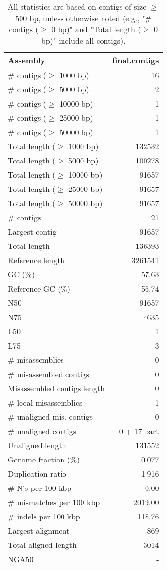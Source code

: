 \documentclass[12pt,a4paper]{article}
\begin{document}
\begin{table}[ht]
\begin{center}
\caption{All statistics are based on contigs of size $\geq$ 500 bp, unless otherwise noted (e.g., "\# contigs ($\geq$ 0 bp)" and "Total length ($\geq$ 0 bp)" include all contigs).}
\begin{tabular}{|l*{1}{|r}|}
\hline
Assembly & final.contigs \\ \hline
\# contigs ($\geq$ 1000 bp) & 16 \\ \hline
\# contigs ($\geq$ 5000 bp) & 2 \\ \hline
\# contigs ($\geq$ 10000 bp) & 1 \\ \hline
\# contigs ($\geq$ 25000 bp) & 1 \\ \hline
\# contigs ($\geq$ 50000 bp) & 1 \\ \hline
Total length ($\geq$ 1000 bp) & 132532 \\ \hline
Total length ($\geq$ 5000 bp) & 100278 \\ \hline
Total length ($\geq$ 10000 bp) & 91657 \\ \hline
Total length ($\geq$ 25000 bp) & 91657 \\ \hline
Total length ($\geq$ 50000 bp) & 91657 \\ \hline
\# contigs & 21 \\ \hline
Largest contig & 91657 \\ \hline
Total length & 136393 \\ \hline
Reference length & 3261541 \\ \hline
GC (\%) & 57.63 \\ \hline
Reference GC (\%) & 56.74 \\ \hline
N50 & 91657 \\ \hline
N75 & 4635 \\ \hline
L50 & 1 \\ \hline
L75 & 3 \\ \hline
\# misassemblies & 0 \\ \hline
\# misassembled contigs & 0 \\ \hline
Misassembled contigs length & 0 \\ \hline
\# local misassemblies & 1 \\ \hline
\# unaligned mis. contigs & 0 \\ \hline
\# unaligned contigs & 0 + 17 part \\ \hline
Unaligned length & 131552 \\ \hline
Genome fraction (\%) & 0.077 \\ \hline
Duplication ratio & 1.916 \\ \hline
\# N's per 100 kbp & 0.00 \\ \hline
\# mismatches per 100 kbp & 2019.00 \\ \hline
\# indels per 100 kbp & 118.76 \\ \hline
Largest alignment & 869 \\ \hline
Total aligned length & 3014 \\ \hline
NGA50 & - \\ \hline
\end{tabular}
\end{center}
\end{table}
\end{document}

